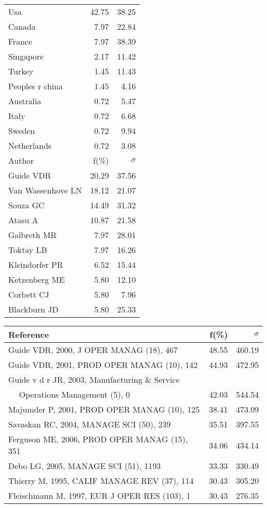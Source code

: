 \documentclass[a4paper,11pt]{report}
\begin{document}
\begin{landscape}
\begin{table}[!ht]
{\begin{tabular}{|l r r|}
\hline
Usa & 42.75 & 38.25\\
Canada & 7.97 & 22.84\\
France & 7.97 & 38.39\\
Singapore & 2.17 & 11.42\\
Turkey & 1.45 & 11.43\\
Peoples r china & 1.45 & 4.16\\
Australia & 0.72 & 5.47\\
Italy & 0.72 & 6.68\\
Sweden & 0.72 & 9.94\\
Netherlands & 0.72 & 3.08\\
\hline
\hline
Author & f(\%) & $\sigma$\\
\hline
Guide VDR & 20.29 & 37.56\\
Van Wassenhove LN & 18.12 & 21.07\\
Souza GC & 14.49 & 31.32\\
Atasu A & 10.87 & 21.58\\
Galbreth MR & 7.97 & 28.01\\
Toktay LB & 7.97 & 16.26\\
Kleindorfer PR & 6.52 & 15.44\\
Ketzenberg ME & 5.80 & 12.10\\
Corbett CJ & 5.80 & 7.96\\
Blackburn JD & 5.80 & 25.33\\
\hline
\end{tabular}
}
{\scriptsize\begin{tabular}{|l r r|}
\hline
Reference & f(\%) & $\sigma$\\
\hline
Guide VDR, 2000, J OPER MANAG (18), 467 & 48.55 & 460.19\\
Guide VDR, 2001, PROD OPER MANAG (10), 142 & 44.93 & 472.95\\
Guide v d r  JR, 2003, Manufacturing \& Service &  & \\
$\quad$ Operations Management (5), 0 & 42.03 & 544.54\\
Majumder P, 2001, PROD OPER MANAG (10), 125 & 38.41 & 473.09\\
Savaskan RC, 2004, MANAGE SCI (50), 239 & 35.51 & 397.55\\
Ferguson ME, 2006, PROD OPER MANAG (15), 351 & 34.06 & 434.14\\
Debo LG, 2005, MANAGE SCI (51), 1193 & 33.33 & 330.49\\
Thierry M, 1995, CALIF MANAGE REV (37), 114 & 30.43 & 305.20\\
Fleischmann M, 1997, EUR J OPER RES (103), 1 & 30.43 & 276.35\\

\end{tabular}}
\end{table}
\end{landscape}
\end{document}
